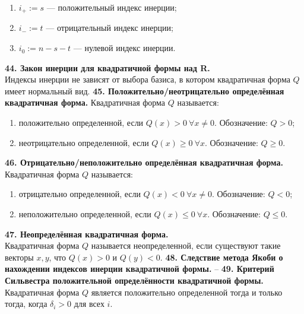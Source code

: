 \documentclass{article}
\begin{document}
\begin{enumerate}
\item $i_+ := s$ --- положительный индекс инерции;
\item $i_- := t$ --- отрицательный индекс инерции;
\item $i_0 := n - s - t$ --- нулевой индекс инерции.
\end{enumerate}
\textbf{44. Закон инерции для квадратичной формы над R.}\\
Индексы инерции не зависят от выбора базиса, в котором квадратичная форма $Q$ имеет нормальный вид.
\newline
\newline
\textbf{45. Положительно/неотрицательно определённая квадратичная форма.}
Квадратичная форма $Q$ называется:
\begin{enumerate}
\item положительно определенной, если $Q(x) > 0\ \forall x \neq 0$. Обозначение: $Q > 0$;
\item неотрицательно определенной, если $Q(x) \geqslant 0\ \forall x$. Обозначение: $Q \geqslant 0$.
\end{enumerate}
\textbf{46. Отрицательно/неположительно определённая квадратичная форма.}\\
Квадратичная форма $Q$ называется:
\begin{enumerate}
\item отрицательно определенной, если $Q(x) < 0\  \forall x \neq 0$. Обозначение: $Q < 0$;
\item неположительно определенной, если $Q(x) \leqslant 0\ \forall x$. Обозначение: $Q \leqslant 0$.
\end{enumerate}
\textbf{47. Неопределённая квадратичная форма.}\\
Квадратичная форма $Q$ называется неопределенной, если существуют такие векторы $x, y$, что $Q(x) > 0$ и $Q(y) < 0$.
\newline
\newline
\textbf{48. Следствие метода Якоби о нахождении индексов инерции квадратичной формы.}
--
\newline
\newline
\textbf{49. Критерий Сильвестра положительной определённости квадратичной формы.}\\
Квадратичная форма $Q$ является положительно определенной тогда и только тогда, когда $\delta_i > 0$  для всех $i$.
\end{document}
